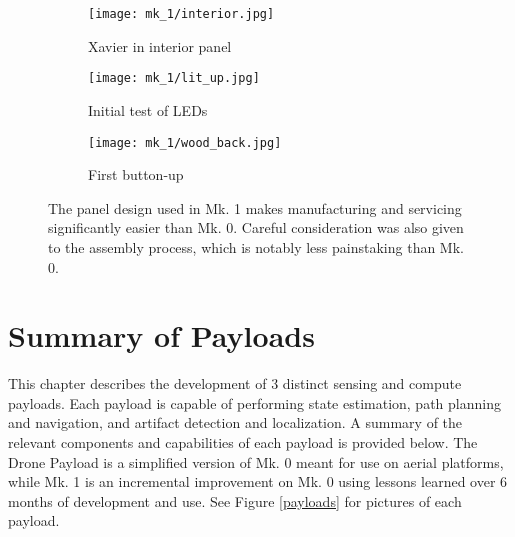 \begin{figure}
	\centering
	\begin{subfigure}{0.32\textwidth}
		\centering
		\texttt{[image: mk\_1/interior.jpg]}
		\caption{Xavier in interior panel}
		\label{mk_1_interior}
	\end{subfigure}
	\hfill
	\begin{subfigure}{0.32\textwidth}
		\centering
		\texttt{[image: mk\_1/lit\_up.jpg]}
		\caption{Initial test of LEDs}
		\label{mk_1_lit_up}
	\end{subfigure}		
	\hfill
	\begin{subfigure}{0.32\textwidth}
		\centering
		\texttt{[image: mk\_1/wood\_back.jpg]}
		\caption{First button-up}
		\label{mk_1_wood_back}
	\end{subfigure}	
	\caption[Pictures from Mk. 1 assembly process]{The panel design used in Mk. 1 makes manufacturing and servicing significantly easier than Mk. 0. Careful consideration was also given to the assembly process, which is notably less painstaking than Mk. 0.}
	\label{mk_1_assembly}
\end{figure}

\section{Summary of Payloads} \label{Summary of Payloads}

This chapter describes the development of 3 distinct sensing and compute payloads. Each payload is capable of performing state estimation, path planning and navigation, and artifact detection and localization. A summary of the relevant components and capabilities of each payload is provided below. The Drone Payload is a simplified version of Mk. 0 meant for use on aerial platforms, while Mk. 1 is an incremental improvement on Mk. 0 using lessons learned over 6 months of development and use. See Figure \ref{payloads} for pictures of each payload.


